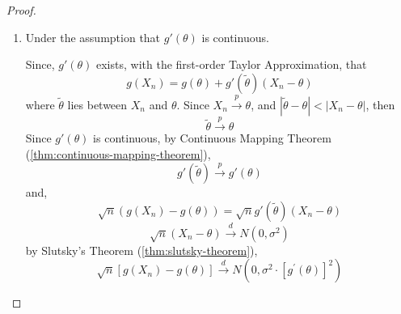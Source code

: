\begin{proof}
    \begin{enumerate}
        \item  Under the assumption that $g'(\theta)$ is continuous.

              Since, $g'(\theta)$ exists, with the first-order Taylor Approximation, that
              \begin{equation*}
                  g(X_n)=g(\theta)+g'(\tilde{\theta})(X_n-\theta)
              \end{equation*}
              where $\tilde{\theta}$ lies between $X_n$ and $\theta$.
              Since $X_n\stackrel{p}{\rightarrow}\theta$, and $|\tilde{\theta}-\theta|<|X_n-\theta|$, then
              \begin{equation*}
                  \tilde{\theta}\stackrel{p}{\rightarrow}\theta
              \end{equation*}
              Since $g'(\theta)$ is continuous, by Continuous Mapping Theorem (\ref{thm:continuous-mapping-theorem}),
              \begin{equation*}
                  g'(\tilde{\theta})\stackrel{p}{\rightarrow}g'(\theta)
              \end{equation*}
              and,
              \begin{equation*}
                  \sqrt{n}\left(g(X_n)-g(\theta)\right)=\sqrt{n}g'(\tilde{\theta})(X_n-\theta)
              \end{equation*}
              \begin{equation*}
                  \sqrt{n}\left(X_{n}-\theta\right)\stackrel{d}{\rightarrow}N\left(0,\sigma^{2}\right)
              \end{equation*}
              by Slutsky's Theorem (\ref{thm:slutsky-theorem}),
              \begin{equation*}
                  \sqrt{n}\left[g\left(X_{n}\right)-g(\theta)\right] \stackrel{d}{\rightarrow}N\left(0,\sigma^{2}\cdot\left[g^{\prime}(\theta)\right]^{2}\right)
              \end{equation*}
    \end{enumerate}
\end{proof}

\begin{theorem}

\end{theorem}

